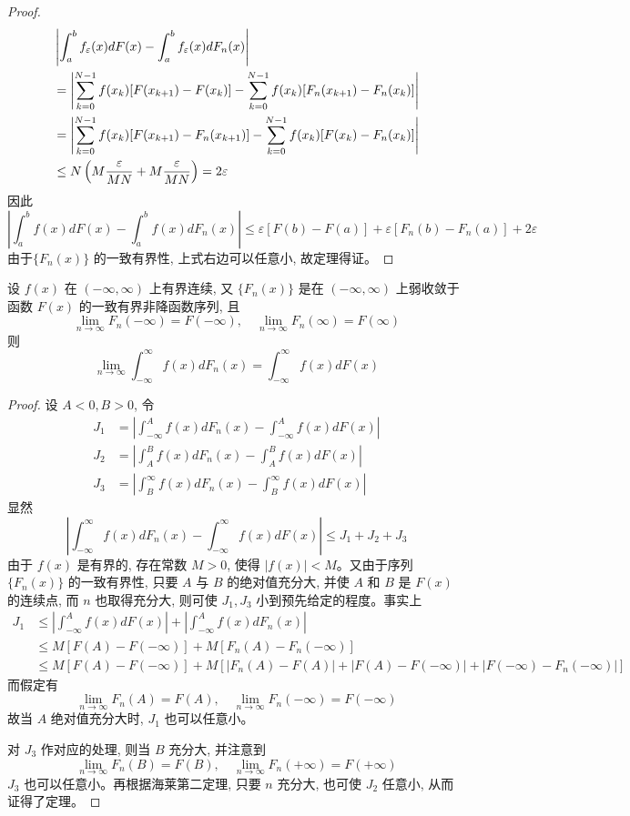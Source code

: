 \begin{proof}
\begin{align}
&\left|\int_a^b f_\varepsilon(x) dF(x) - \int_a^b f_\varepsilon(x) dF_n(x)\right| \notag \\
&= \left|\sum_{k=0}^{N-1} f(x_k) [F(x_{k+1}) - F(x_k)] - \sum_{k=0}^{N-1} f(x_k) [F_n(x_{k+1}) - F_n(x_k)]\right| \notag \\
&= \left|\sum_{k=0}^{N-1} f(x_k) [F(x_{k+1}) - F_n(x_{k+1})] - \sum_{k=0}^{N-1} f(x_k) [F(x_k) - F_n(x_k)]\right| \notag \\
&\le N\left(M \frac{\varepsilon}{MN} + M \frac{\varepsilon}{MN}\right) = 2\varepsilon \label{eq:5.2.14}
\end{align}
因此
\[
\left|\int_a^b f(x) dF(x) - \int_a^b f(x) dF_n(x)\right| \le \varepsilon [F(b) - F(a)] + \varepsilon [F_n(b) - F_n(a)] + 2\varepsilon
\]
由于$\{F_n(x)\}$ 的一致有界性, 上式右边可以任意小, 故定理得证。
\end{proof}

\begin{theorem}[拓广的海莱第二定理]\label{thm:helly_second_extended}
设 $f(x)$ 在 $(-\infty, \infty)$ 上有界连续, 又 $\{F_n(x)\}$ 是在 $(-\infty, \infty)$ 上弱收敛于函数 $F(x)$ 的一致有界非降函数序列, 且
\[
\lim_{n\to\infty} F_n(-\infty) = F(-\infty), \quad \lim_{n\to\infty} F_n(\infty) = F(\infty)
\]
则
\[
\lim_{n\to\infty} \int_{-\infty}^\infty f(x) dF_n(x) = \int_{-\infty}^\infty f(x) dF(x)
\]
\end{theorem}

\begin{proof}
设 $A<0, B>0$, 令
\begin{align*}
J_1 &= \left|\int_{-\infty}^A f(x) dF_n(x) - \int_{-\infty}^A f(x) dF(x)\right| \\
J_2 &= \left|\int_A^B f(x) dF_n(x) - \int_A^B f(x) dF(x)\right| \\
J_3 &= \left|\int_B^\infty f(x) dF_n(x) - \int_B^\infty f(x) dF(x)\right|
\end{align*}
显然
\[
\left|\int_{-\infty}^\infty f(x) dF_n(x) - \int_{-\infty}^\infty f(x) dF(x)\right| \le J_1 + J_2 + J_3
\]
由于 $f(x)$ 是有界的, 存在常数 $M>0$, 使得 $|f(x)|<M$。又由于序列$\{F_n(x)\}$ 的一致有界性, 只要 $A$ 与 $B$ 的绝对值充分大, 并使 $A$ 和 $B$ 是 $F(x)$ 的连续点, 而 $n$ 也取得充分大, 则可使 $J_1, J_3$ 小到预先给定的程度。事实上
\begin{align*}
J_1 &\le \left|\int_{-\infty}^A f(x) dF(x)\right| + \left|\int_{-\infty}^A f(x) dF_n(x)\right| \\
&\le M[F(A)-F(-\infty)] + M[F_n(A)-F_n(-\infty)] \\
&\le M[F(A)-F(-\infty)] + M[|F_n(A)-F(A)|+|F(A)-F(-\infty)|+|F(-\infty)-F_n(-\infty)|]
\end{align*}
而假定有
\[
\lim_{n\to\infty} F_n(A) = F(A), \quad \lim_{n\to\infty} F_n(-\infty) = F(-\infty)
\]
故当 $A$ 绝对值充分大时, $J_1$ 也可以任意小。

对 $J_3$ 作对应的处理, 则当 $B$ 充分大, 并注意到
\[
\lim_{n\to\infty} F_n(B) = F(B), \quad \lim_{n\to\infty} F_n(+\infty) = F(+\infty)
\]
$J_3$ 也可以任意小。再根据海莱第二定理, 只要 $n$ 充分大, 也可使 $J_2$ 任意小, 从而证得了定理。
\end{proof}

